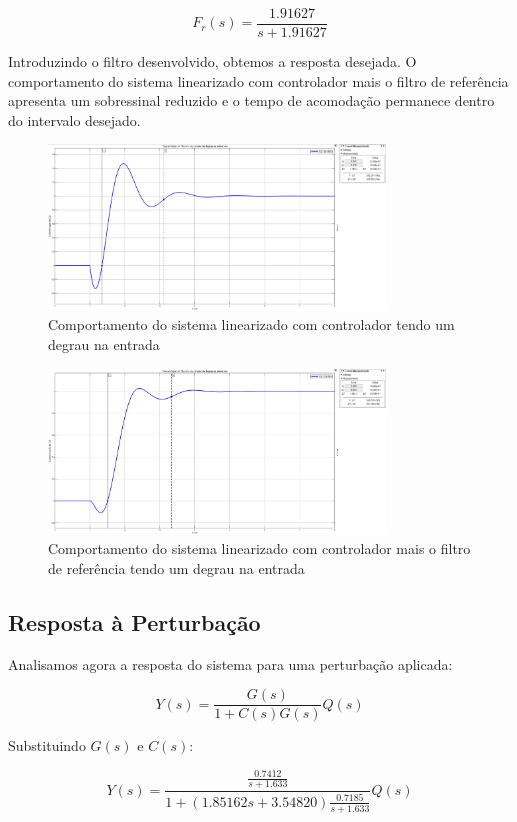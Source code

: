 \documentclass[a4paper,12pt]{report}
\begin{document}
\[
F_r(s) = \frac{1.91627}{s + 1.91627}
\]

Introduzindo o filtro desenvolvido, obtemos a resposta desejada. O comportamento do sistema linearizado com controlador mais o filtro de referência apresenta um sobressinal reduzido e o tempo de acomodação permanece dentro do intervalo desejado.

\begin{figure}[h]
\centering
\includegraphics[width=0.8\textwidth]{figura14.png}
\caption{Comportamento do sistema linearizado com controlador tendo um degrau na entrada}
\end{figure}

\begin{figure}[h]
\centering
\includegraphics[width=0.8\textwidth]{figura15.png}
\caption{Comportamento do sistema linearizado com controlador mais o filtro de referência tendo um degrau na entrada}
\end{figure}

\subsection*{Resposta à Perturbação}

Analisamos agora a resposta do sistema para uma perturbação aplicada:

\[
Y(s) = \frac{G(s)}{1 + C(s)G(s)}Q(s)
\]

Substituindo \( G(s) \) e \( C(s) \):

\[
Y(s) = \frac{\frac{0.7412}{s + 1.633}}{1 + (1.85162s + 3.54820)\frac{0.7185}{s + 1.633}}Q(s)
\]
\end{document}
